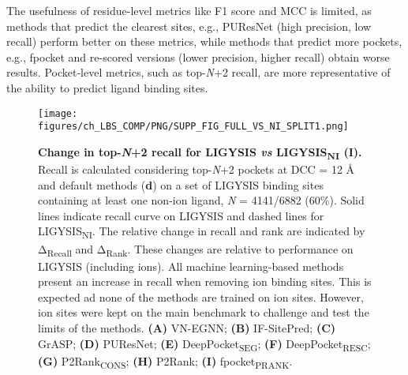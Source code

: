 The usefulness of residue-level metrics like F1 score and MCC is limited, as methods that predict the clearest sites, e.g., PUResNet (high precision, low recall) perform better on these metrics, while methods that predict more pockets, e.g., fpocket and re-scored versions (lower precision, higher recall) obtain worse results. Pocket-level metrics, such as top-\textit{N}+2 recall, are more representative of the ability to predict ligand binding sites.

\begin{figure}[htb!]
    \centering
    \texttt{[image: figures/ch\_LBS\_COMP/PNG/SUPP\_FIG\_FULL\_VS\_NI\_SPLIT1.png]}
    \caption[Change in top-\textit{N}+2 recall for LIGYSIS \textit{vs} LIGYSIS\textsubscript{NI} (I)]{\textbf{Change in top-\textit{N}+2 recall for LIGYSIS \textit{vs} LIGYSIS\textsubscript{NI} (I).} Recall is calculated considering top-\textit{N}+2 pockets at DCC = 12 \AA{} and default methods (\textbf{d}) on a set of LIGYSIS binding sites containing at least one non-ion ligand, \textit{N} = 4141/6882 (60\%). Solid lines indicate recall curve on LIGYSIS and dashed lines for LIGYSIS\textsubscript{NI}. The relative change in recall and rank are indicated by Δ\textsubscript{Recall} and Δ\textsubscript{Rank}. These changes are relative to performance on LIGYSIS (including ions). All machine learning-based methods present an increase in recall when removing ion binding sites. This is expected ad none of the methods are trained on ion sites. However, ion sites were kept on the main benchmark to challenge and test the limits of the methods. \textbf{(A)} VN-EGNN; \textbf{(B)} IF-SitePred; \textbf{(C)} GrASP; \textbf{(D)} PUResNet; \textbf{(E)} DeepPocket\textsubscript{SEG}; \textbf{(F)} DeepPocket\textsubscript{RESC}; \textbf{(G)} P2Rank\textsubscript{CONS}; \textbf{(H)} P2Rank; \textbf{(I)} fpocket\textsubscript{PRANK}.}
    \label{fig:LIGYSIS_VS_LIGYSISNI_1}
\end{figure}

